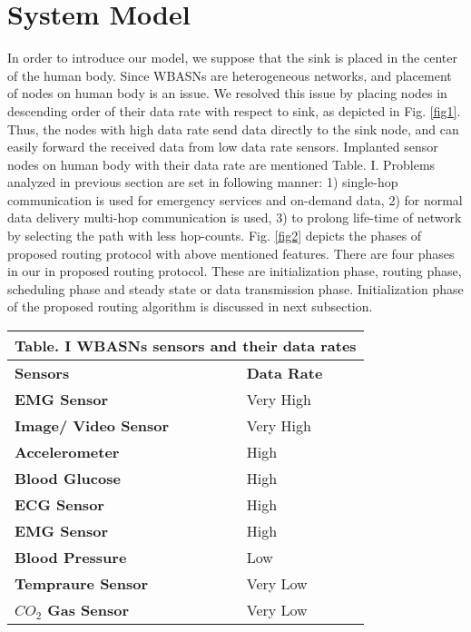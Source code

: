 \documentclass[journal]{IEEEtran}
\begin{document}
\section{System Model}
In order to introduce our model, we suppose that the sink is placed in the center of the human body. Since WBASNs are heterogeneous networks, and placement of nodes on human body is an issue. We resolved this issue by placing nodes in descending order of their data rate with respect to sink, as depicted in Fig. \ref{fig1}. Thus, the nodes with high data rate send data directly to the sink node, and can easily forward the received data from low data rate sensors. Implanted sensor nodes on human body with their data rate are mentioned Table. I. Problems analyzed in previous section are set in following manner: 1) single-hop communication is used for emergency services and on-demand data, 2) for normal data delivery multi-hop communication is used, 3) to prolong life-time of network by selecting the path with less hop-counts. Fig. \ref{fig2} depicts the phases of proposed routing protocol with above mentioned features. There are four phases in our in proposed routing protocol. These are initialization phase, routing phase, scheduling phase and steady state or data transmission phase. Initialization phase of the proposed routing algorithm is discussed in next subsection.


\begin{table}[!ht]
\begin{center}
\begin{tabular}{| p{3cm} || p{3cm} |}
   \multicolumn{2}{c}{Table. I WBASNs sensors and their data rates}\\
  \hline
  \textbf{Sensors}                & \textbf{Data Rate}   \\ \hline \hline
   \textbf{EMG Sensor}            &  Very High	 \\ \hline
    \textbf{Image/ Video Sensor}  & Very High	 \\ \hline
     \textbf{Accelerometer}       & High \\ \hline
     \textbf{Blood Glucose}       & High	 \\ \hline
     \textbf{ECG Sensor}	      & High	 \\ \hline
      \textbf{EMG Sensor}         & High	 \\ \hline
      \textbf{Blood Pressure}     & Low	 \\ \hline
       \textbf{Tempraure Sensor}  & Very Low	 \\ \hline
      \textbf{$CO_{2}$ Gas Sensor}& Very Low	 \\ \hline
\end{tabular}
\end{center}
\end{table}
\end{document}
